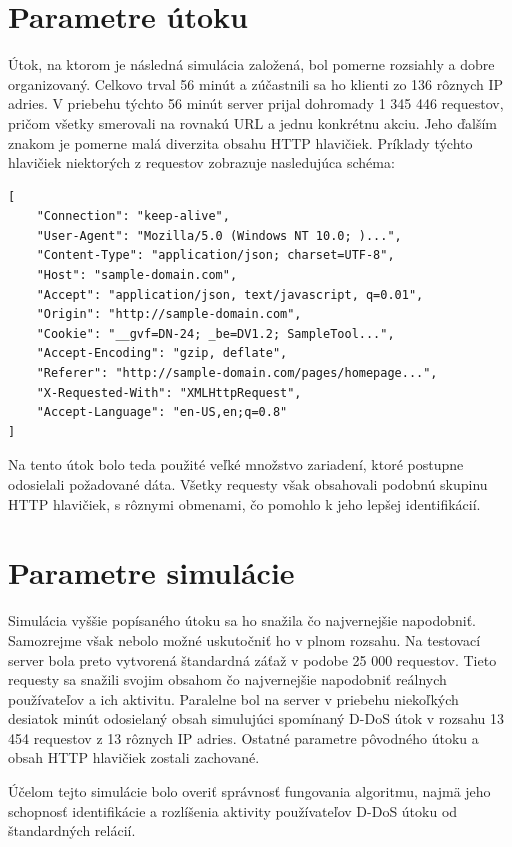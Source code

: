 \documentclass[
  digital, %
  table,   %
  lof,     %
  nolot,   %
  nocover
]{fithesis3}
\begin{document}
\section{Parametre útoku}
Útok, na ktorom je následná simulácia založená, bol pomerne rozsiahly a dobre
organizovaný. Celkovo trval 56 minút a zúčastnili sa ho klienti zo 136 rôznych
IP adries. V priebehu týchto 56 minút server prijal dohromady 1 345 446 requestov, pričom
všetky smerovali na rovnakú URL a jednu konkrétnu akciu. Jeho ďalším znakom je
pomerne malá diverzita obsahu HTTP hlavičiek. Príklady týchto hlavičiek
niektorých z requestov zobrazuje nasledujúca schéma: 

\begin{lstlisting}[basicstyle=\footnotesize, mathescape=true]
[
    "Connection": "keep-alive",
    "User-Agent": "Mozilla/5.0 (Windows NT 10.0; )...",
    "Content-Type": "application/json; charset=UTF-8",
    "Host": "sample-domain.com",
    "Accept": "application/json, text/javascript, q=0.01",
    "Origin": "http://sample-domain.com",
    "Cookie": "__gvf=DN-24; _be=DV1.2; SampleTool...",
    "Accept-Encoding": "gzip, deflate",
    "Referer": "http://sample-domain.com/pages/homepage...",
    "X-Requested-With": "XMLHttpRequest",
    "Accept-Language": "en-US,en;q=0.8"
]
\end{lstlisting}

Na tento útok bolo teda použité veľké množstvo zariadení, ktoré postupne
odosielali požadované dáta. Všetky requesty však obsahovali podobnú skupinu
HTTP hlavičiek, s rôznymi obmenami, čo pomohlo k jeho lepšej identifikácií.

\section{Parametre simulácie}
Simulácia vyššie popísaného útoku sa ho snažila čo najvernejšie napodobniť.
Samozrejme však nebolo možné uskutočniť ho v plnom rozsahu. Na testovací server
bola preto vytvorená štandardná záťaž v podobe 25 000 requestov. Tieto requesty
sa snažili svojim obsahom čo najvernejšie napodobniť reálnych používateľov a
ich aktivitu. Paralelne bol na server  v priebehu niekoľkých desiatok minút
odosielaný obsah simulujúci spomínaný D-DoS útok v rozsahu 13 454 requestov z
13 rôznych IP adries. Ostatné parametre pôvodného útoku a obsah HTTP hlavičiek
zostali zachované.

Účelom tejto simulácie bolo overiť správnosť fungovania algoritmu, najmä jeho
schopnosť identifikácie a rozlíšenia aktivity používateľov D-DoS útoku od
štandardných relácií.
\end{document}
